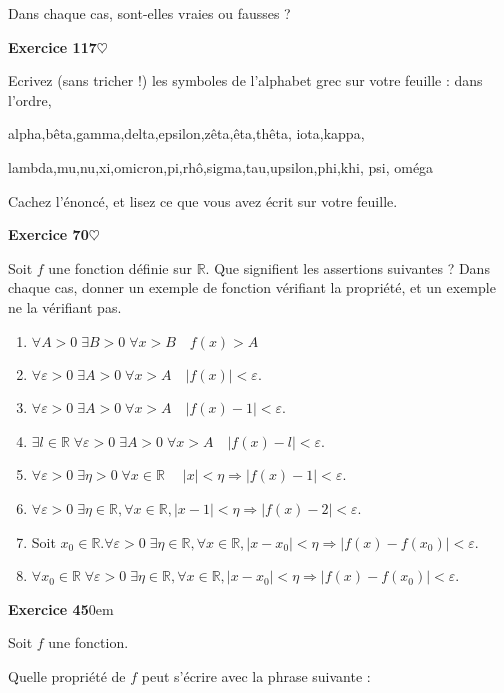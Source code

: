 ﻿\documentclass[11pt,a4paper]{amsart}
\theoremstyle{theorem}
\theoremstyle{definition}
\newcommand{\coeur}{$\heartsuit$}
\newcommand{\eps}{\varepsilon}
\def\RR{{\mathbb R}}
\newcounter{qcounter}
\newcounter{qscounter}
\newcommand{\exosd}[1]{\vspace{.3cm}\hangindent0em\hangafter=0%
\noindent{\textbf{Exercice .} \textit{#1}}}
\begin{document}
Dans chaque cas, sont-elles vraies ou fausses ?

\setcounter{qcounter}{0} \setcounter{qscounter}{0}\textbf{Exercice 117}{\coeur}

\question Ecrivez (sans tricher !) les symboles de l'alphabet grec sur votre feuille : dans l'ordre,

{alpha},{bêta},{gamma},{delta},{epsilon},{zêta},{êta},{thêta},
{iota},kappa,

lambda,mu,nu,xi,omicron,pi,rhô,sigma,tau,upsilon,phi,khi,
psi,
oméga

\question Cachez l'énoncé, et lisez ce que vous avez écrit sur votre feuille.


\setcounter{qcounter}{0} \setcounter{qscounter}{0}\textbf{Exercice 70}{\coeur}

Soit $f$ une fonction définie sur $\RR$. Que signifient les assertions suivantes ? Dans chaque cas, donner un exemple de fonction vérifiant la propriété, et un exemple ne la vérifiant pas.

\begin{enumerate}
\item $\forall A>0\; \exists B>0 \;\forall x>B\quad f(x)>A$
\item $\forall \eps>0\; \exists A>0\;\forall x>A\quad |f(x)|<\eps$.
\item $\forall \eps>0\;\exists A>0\;\forall x>A\quad |f(x)-1|<\eps$.
\item $\exists l \in \RR \; \forall \eps>0\;\exists A>0\;\forall x>A\quad |f(x)-l|<\eps$.
\item $\forall \eps>0 \; \exists \eta >0 \; \forall x\in\RR \; \quad |x|<\eta \Rightarrow |f(x)-1|<\eps$.
\item $\forall \eps >0 \; \exists \eta \in \RR, \forall x \in \RR, |x-1|<\eta \Rightarrow |f(x)- 2|< \eps$.
\item Soit $ x_0 \in \RR. \forall \eps >0 \; \exists \eta \in \RR, \forall x \in \RR, |x-x_0|<\eta \Rightarrow |f(x)-f(x_0)|< \eps$.
\item $\forall x_0 \in \RR \; \forall \eps >0 \; \exists \eta \in \RR, \forall x \in \RR, |x-x_0|<\eta \Rightarrow |f(x)-f(x_0)|< \eps$.
\end{enumerate}


\setcounter{qcounter}{0} \setcounter{qscounter}{0}\textbf{Exercice 45}\exosd{5min}

Soit $f$ une fonction. 

\question Quelle propriété de $f$ peut s'écrire avec la phrase suivante :
\end{document}
